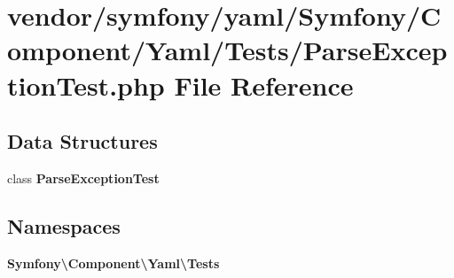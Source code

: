 \section{vendor/symfony/yaml/\+Symfony/\+Component/\+Yaml/\+Tests/\+Parse\+Exception\+Test.php File Reference}
\label{_parse_exception_test_8php}
\subsection*{Data Structures}
\begin{DoxyCompactItemize}
\item 
class {\bf Parse\+Exception\+Test}
\end{DoxyCompactItemize}
\subsection*{Namespaces}
\begin{DoxyCompactItemize}
\item 
 {\bf Symfony\textbackslash{}\+Component\textbackslash{}\+Yaml\textbackslash{}\+Tests}
\end{DoxyCompactItemize}
